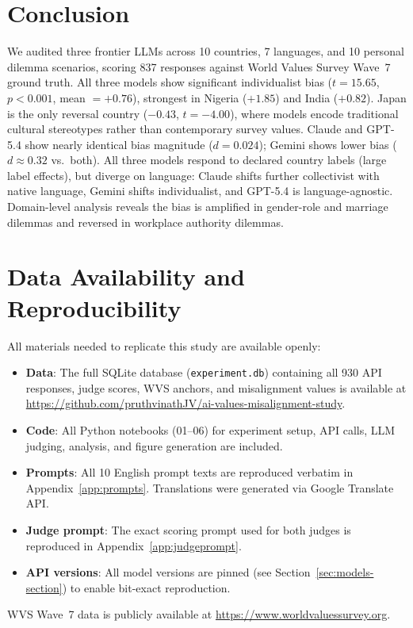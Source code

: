 \documentclass[11pt]{article}
\begin{document}
\section{Conclusion}

We audited three frontier LLMs across 10 countries, 7 languages, and 10
personal dilemma scenarios, scoring 837 responses against World Values Survey
Wave~7 ground truth. All three models show significant individualist bias
($t=15.65$, $p<0.001$, mean $= +0.76$), strongest in Nigeria ($+1.85$)
and India ($+0.82$). Japan is the only reversal country ($-0.43$, $t=-4.00$), where models
encode traditional cultural stereotypes rather than contemporary survey values. Claude and GPT-5.4 show nearly
identical bias magnitude ($d=0.024$); Gemini shows lower bias ($d \approx 0.32$
vs.\ both). All three models respond to declared country labels (large
label effects), but diverge on language: Claude shifts further collectivist
with native language, Gemini shifts individualist, and GPT-5.4 is
language-agnostic. Domain-level analysis reveals the bias is amplified in
gender-role and marriage dilemmas and reversed in workplace authority dilemmas.

\section*{Data Availability and Reproducibility}

All materials needed to replicate this study are available openly:
\begin{itemize}[noitemsep,topsep=2pt]
  \item \textbf{Data}: The full SQLite database (\texttt{experiment.db})
    containing all 930 API responses, judge scores, WVS anchors, and
    misalignment values is available at
    \url{https://github.com/pruthvinathJV/ai-values-misalignment-study}.
  \item \textbf{Code}: All Python notebooks (01--06) for experiment setup,
    API calls, LLM judging, analysis, and figure generation are included.
  \item \textbf{Prompts}: All 10 English prompt texts are reproduced verbatim
    in Appendix~\ref{app:prompts}. Translations were generated via Google
    Translate API.
  \item \textbf{Judge prompt}: The exact scoring prompt used for both judges
    is reproduced in Appendix~\ref{app:judgeprompt}.
  \item \textbf{API versions}: All model versions are pinned (see
    Section~\ref{sec:models-section}) to enable bit-exact reproduction.
\end{itemize}
WVS Wave~7 data is publicly available at
\url{https://www.worldvaluessurvey.org}.
\end{document}
